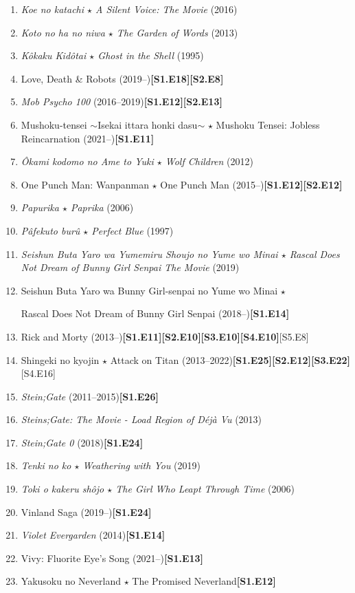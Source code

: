 \documentclass{article}
\numberwithin{equation}{section}
\begin{document}
\begin{enumerate}
    \item \textit{Koe no katachi $\star$ A Silent Voice: The Movie} (2016)
    \item \textit{Koto no ha no niwa $\star$ The Garden of Words} (2013)
    \item \textit{Kôkaku Kidôtai $\star$ Ghost in the Shell} (1995)
    \item Love, Death \& Robots (2019--)\hfill\textbf{[S1.E18][S2.E8]}
    \item \textit{Mob Psycho 100} (2016--2019)\hfill\textbf{[S1.E12][S2.E13]}
    \item Mushoku-tensei $\sim$Isekai ittara honki dasu$\sim$ $\star$ Mushoku Tensei: Jobless Reincarnation (2021--)\hfill\textbf{[S1.E11]}
    \item \textit{Ôkami kodomo no Ame to Yuki $\star$ Wolf Children} (2012)
    \item One Punch Man: Wanpanman $\star$ One Punch Man (2015--)\hfill\textbf{[S1.E12][S2.E12]}
    \item \textit{Papurika $\star$ Paprika} (2006)
    \item \textit{Pâfekuto burû $\star$ Perfect Blue} (1997)
    \item \textit{Seishun Buta Yaro wa Yumemiru Shoujo no Yume wo Minai $\star$ Rascal Does Not Dream of Bunny Girl Senpai The Movie} (2019)
    \item Seishun Buta Yaro wa Bunny Girl-senpai no Yume wo Minai $\star$
    
    Rascal Does Not Dream of Bunny Girl Senpai (2018--)\hfill\textbf{[S1.E14]}
    \item Rick and Morty (2013--)\hfill\textbf{[S1.E11][S2.E10][S3.E10][S4.E10]}[S5.E8]
    \item Shingeki no kyojin $\star$ Attack on Titan (2013--2022)\hfill\textbf{[S1.E25][S2.E12][S3.E22]}[S4.E16]
    \item \textit{Stein;Gate} (2011--2015)\hfill\textbf{[S1.E26]}
    \item \textit{Steins;Gate: The Movie - Load Region of Déjà Vu} (2013)
    \item \textit{Stein;Gate 0} (2018)\hfill\textbf{[S1.E24]}
    \item \textit{Tenki no ko $\star$ Weathering with You} (2019)
    \item \textit{Toki o kakeru shôjo $\star$ The Girl Who Leapt Through Time} (2006)
    \item Vinland Saga (2019--)\hfill\textbf{[S1.E24]}
    \item \textit{Violet Evergarden} (2014)\hfill\textbf{[S1.E14]}
    \item Vivy: Fluorite Eye's Song (2021--)\hfill\textbf{[S1.E13]}
    \item Yakusoku no Neverland $\star$ The Promised Neverland\hfill\textbf{[S1.E12]}
\end{enumerate}
\end{document}
